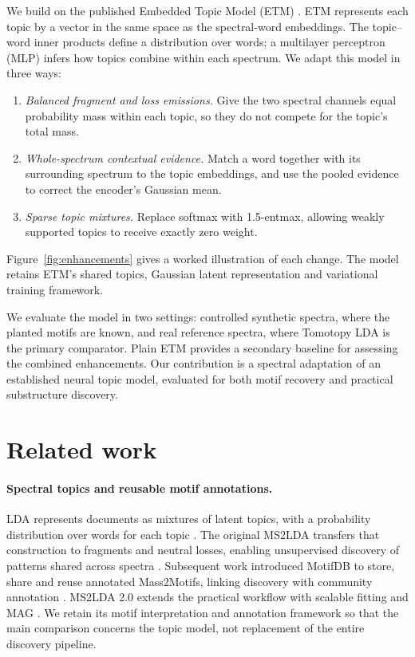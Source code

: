 \documentclass[10pt,a4paper]{article}
\begin{document}
We build on the published Embedded Topic Model (ETM) \cite{dieng2020}.
ETM represents each topic by a vector in the same space as the spectral-word
embeddings. The topic--word inner products define a distribution over words;
a multilayer perceptron (MLP) infers how topics combine within each spectrum.
We adapt this model in three ways:
\begin{enumerate}
 \item \emph{Balanced fragment and loss emissions.} Give the two spectral
 channels equal probability mass within each topic, so they do not compete
 for the topic's total mass.
 \item \emph{Whole-spectrum contextual evidence.} Match a word together with
 its surrounding spectrum to the topic embeddings, and use the pooled
 evidence to correct the encoder's Gaussian mean.
 \item \emph{Sparse topic mixtures.} Replace softmax with 1.5-entmax, allowing
 weakly supported topics to receive exactly zero weight.
\end{enumerate}
Figure~\ref{fig:enhancements} gives a worked illustration of each change.
The model retains ETM's shared topics, Gaussian latent representation and
variational training framework.

We evaluate the model in two settings: controlled synthetic spectra, where
the planted motifs are known, and real reference spectra, where Tomotopy LDA
is the primary comparator. Plain ETM provides a secondary baseline for
assessing the combined enhancements. Our contribution is a spectral adaptation
of an established neural topic model, evaluated for both motif recovery and
practical substructure discovery.

\section{Related work}

\paragraph{Spectral topics and reusable motif annotations.}
LDA represents documents as mixtures of latent topics, with a probability
distribution over words for each topic \cite{blei2003}. The original MS2LDA
transfers that construction to fragments and neutral losses, enabling
unsupervised discovery of patterns shared across spectra \cite{vanderhooft2016}.
Subsequent work introduced MotifDB to store, share and reuse annotated
Mass2Motifs, linking discovery with community annotation
\cite{rogers2019}. MS2LDA 2.0 extends the practical workflow with scalable
fitting and MAG \cite{torresortega2026}. We retain its motif interpretation
and annotation framework so that the main comparison concerns the topic model,
not replacement of the entire discovery pipeline.
\end{document}
